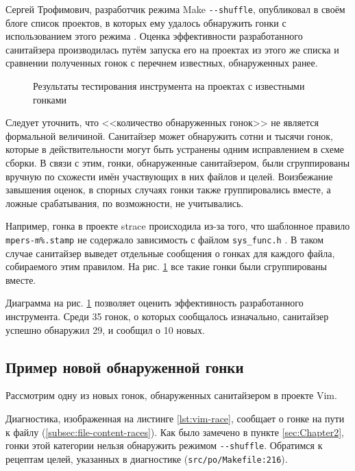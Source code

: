 Сергей Трофимович, разработчик режима Make \texttt{{-}{-}shuffle}, опубликовал в своём блоге список проектов, в которых ему удалось обнаружить гонки с использованием этого режима \cite{trofi-make-shuffle}. Оценка эффективности разработанного санитайзера производилась путём запуска его на проектах из этого же списка и сравнении полученных гонок с перечнем известных, обнаруженных ранее.

\begin{figure}[H]
    \centering
    
    \caption{Результаты тестирования инструмента на проектах с известными гонками}
    \label{fig:testing-results}
\end{figure}

Следует уточнить, что <<количество обнаруженных гонок>> не является формальной величиной. Санитайзер может обнаружить сотни и тысячи гонок, которые в действительности могут быть устранены одним исправлением в схеме сборки. В связи с этим, гонки, обнаруженные санитайзером, были сгруппированы вручную по схожести имён участвующих в них файлов и целей. Воизбежание завышения оценок, в спорных случаях гонки также группировались вместе, а ложные срабатывания, по возможности, не учитывались.

Например, гонка в проекте strace происходила из-за того, что шаблонное правило \texttt{mpers-m\%.stamp} не содержало зависимость с файлом \texttt{sys\_func.h} \cite{strace-race}. В таком случае санитайзер выведет отдельные сообщения о гонках для каждого файла, собираемого этим правилом. На рис. \ref{fig:testing-results} все такие гонки были сгруппированы вместе.

Диаграмма на рис. \ref{fig:testing-results} позволяет оценить эффективность разработанного инструмента. Среди 35 гонок, о которых сообщалось изначально, санитайзер успешно обнаружил 29, и сообщил о 10 новых.

\subsection{Пример новой обнаруженной гонки}

Рассмотрим одну из новых гонок, обнаруженных санитайзером в проекте Vim.



Диагностика, изображенная на листинге \ref{lst:vim-race}, сообщает о гонке на пути к файлу (\ref{subsec:file-content-races}). Как было замечено в пункте \ref{sec:Chapter2}, гонки этой категории нельзя обнаружить режимом \texttt{{-}{-}shuffle}. Обратимся к рецептам целей, указанных в диагностике (\texttt{src/po/Makefile:216}).

